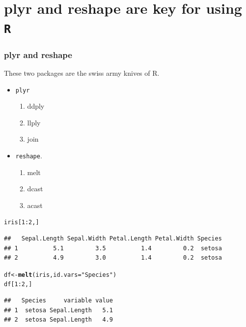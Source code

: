 \documentclass{beamer}\usepackage{graphicx, color}
\makeatletter
\newcommand{\hlfunctioncall}[1]{\textcolor[rgb]{0.501960784313725,0,0.329411764705882}{\textbf{#1}}}%
\newcommand{\hlstring}[1]{\textcolor[rgb]{0.6,0.6,1}{#1}}%
\newenvironment{kframe}{%
 \def\at@end@of@kframe{}%
 \ifinner\ifhmode%
  \def\at@end@of@kframe{\end{minipage}}%
  \begin{minipage}{\columnwidth}%
 \fi\fi%
 \def\FrameCommand##1{\hskip\@totalleftmargin \hskip-\fboxsep
 \colorbox{shadecolor}{##1}\hskip-\fboxsep
     \hskip-\linewidth \hskip-\@totalleftmargin \hskip\columnwidth}%
 \MakeFramed {\advance\hsize-\width
   \@totalleftmargin\z@ \linewidth\hsize
   \@setminipage}}%
 {\par\unskip\endMakeFramed%
 \at@end@of@kframe}
\newenvironment{knitrout}{}{} %
\makeatother
\begin{document}
\section*{plyr and reshape are key for using \texttt{R}}
\frame{\sectionpage}

\begin{frame}[fragile]
\frametitle{plyr and reshape}
These two packages are the swiss army knives of R.
\begin{itemize}
\item \texttt{plyr}
    \begin{enumerate}
    \item ddply
    \item llply
    \item join
    \end{enumerate}
\item \texttt{reshape}.
    \begin{enumerate}
    \item melt
    \item dcast
    \item acast
    \end{enumerate}
\end{itemize}
\end{frame}


\begin{frame}[fragile]
\begin{knitrout}\footnotesize
{}\color{fgcolor}\begin{kframe}
\begin{alltt}
iris[1:2, ]
\end{alltt}
\begin{verbatim}
##   Sepal.Length Sepal.Width Petal.Length Petal.Width Species
## 1          5.1         3.5          1.4         0.2  setosa
## 2          4.9         3.0          1.4         0.2  setosa
\end{verbatim}
\begin{alltt}
df  <- \hlfunctioncall{melt}(iris, id.vars = \hlstring{"Species"})
df[1:2, ]
\end{alltt}
\begin{verbatim}
##   Species     variable value
## 1  setosa Sepal.Length   5.1
## 2  setosa Sepal.Length   4.9
\end{verbatim}
\end{kframe}
\end{knitrout}

\end{frame}
\end{document}

